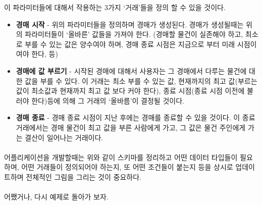 \documentclass[a4paper, 11pt]{article}
\begin{document}
    이 파라미터들에 대해서 작용하는 3가지 `거래'들을 정의 할 수 있을 것이다.
    \begin{itemize}
        \item \textbf{경매 시작} - 위의 파라미터들을 정의하며 경매가 생성된다. 경매가 생성될때는 위의 파라미터들이 `올바른' 값들을 가져야 한다. (경매할 물건이 실존해야 하고, 최소로 부를 수 있는 값은 양수여야 하며, 경매 종료 시점은 지금으로 부터 미래 시점이여야 한다, 등)
        \item \textbf{경매에 값 부르기} - 시작된 경매에 대해서 사용자는 그 경매에서 다루는 물건에 대한 값을 부를 수 있다. 이 거래는 최소 부를 수 있는 값, 현재까지의 최고 값(부르는 값이 최소값과 현재까지 최고 값 보다 커야 한다), 종료 시점(종료 시점 이전에 불러야 한다)등에 의해 그 거래의 `올바름'이 결정될 것이다. 
        \item \textbf{경매 종료} - 경매 종료 시점이 지난 후에는 경매를 종료할 수 있을 것이다. 이 종료 거래에서는 경매 물건이 최고 값을 부른 사람에게 가고, 그 값은 물건 주인에게 가는 결산이 일어나는 거래이다.
    \end{itemize}
    
    \paragraph{} 어플리케이션을 개발할때는 위와 같이 스키마를 정리하고 어떤 데이터 타입들이 필요하며, 어떤 거래들이 정의되어야 하는지, 또 어떤 조건들이 붙는지 등을 상시로 업데이트하며 전체적인 그림을 그리는 것이 중요하다.

    \paragraph{} 어쨌거나, 다시 예제로 돌아가 보자.
    
\end{document}
